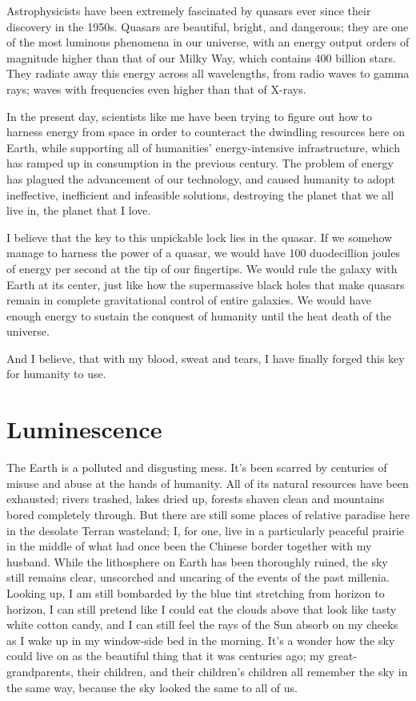 \documentclass{book}
\begin{document}
			Astrophysicists have been extremely fascinated by quasars ever since their discovery in
			the 1950s. Quasars are beautiful, bright, and dangerous; they are one of the most
			luminous phenomena in our universe, with an energy output orders of magnitude higher
			than that of our Milky Way, which contains 400 billion stars. They radiate away this
			energy across all wavelengths, from radio waves to gamma rays; waves with frequencies
			even higher than that of X-rays.

			In the present day, scientists like me have been trying to figure out how to harness
			energy from space in order to counteract the dwindling resources here on Earth, while
			supporting all of humanities' energy-intensive infrastructure, which has ramped up in
			consumption in the previous century. The problem of energy has plagued the advancement
			of our technology, and caused humanity to adopt ineffective, inefficient and infeasible
			solutions, destroying the planet that we all live in, the planet that I love.

			I believe that the key to this unpickable lock lies in the quasar. If we somehow manage
			to harness the power of a quasar, we would have 100 duodecillion joules of energy per
			second at the tip of our fingertips. We would rule the galaxy with Earth at its center,
			just like how the supermassive black holes that make quasars remain in complete
			gravitational control of entire galaxies. We would have enough energy to sustain the
			conquest of humanity until the heat death of the universe.

			And I believe, that with my blood, sweat and tears, I have finally forged this key for
			humanity to use.



		\chapter{Luminescence}
			The Earth is a polluted and disgusting mess. It's been scarred by centuries of misuse
			and abuse at the hands of humanity. All of its natural resources have been exhausted;
			rivers trashed, lakes dried up, forests shaven clean and mountains bored completely
			through. But there are still some places of relative paradise here in the desolate
			Terran wasteland; I, for one, live in a particularly peaceful prairie in the middle of
			what had once been the Chinese border together with my husband. While the
			lithosphere on Earth has been thoroughly ruined, the sky still remains clear,
			unscorched and uncaring of the events of the past millenia. Looking up, I am still
			bombarded by the blue tint stretching from horizon to horizon, I can still pretend like
			I could eat the clouds above that look like tasty white cotton candy, and I can still
			feel the rays of the Sun absorb on my cheeks as I wake up in my window-side bed in the
			morning. It's a wonder how the sky could live on as the beautiful thing that it was
			centuries ago; my great-grandparents, their children, and their children's children all
			remember the sky in the same way, because the sky looked the same to all of us.
\end{document}
